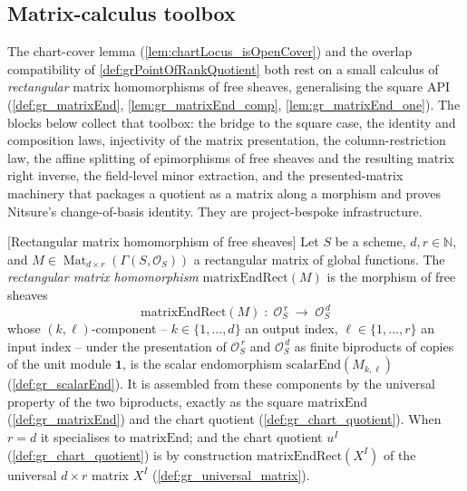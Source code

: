 \subsection{Matrix-calculus toolbox}

The chart-cover lemma (\cref{lem:chartLocus_isOpenCover}) and the overlap compatibility of
\cref{def:grPointOfRankQuotient} both rest on a small calculus of \emph{rectangular} matrix
homomorphisms of free sheaves, generalising the square API
(\cref{def:gr_matrixEnd}, \cref{lem:gr_matrixEnd_comp}, \cref{lem:gr_matrixEnd_one}). The
blocks below collect that toolbox: the bridge to the square case, the identity and
composition laws, injectivity of the matrix presentation, the column-restriction law, the
affine splitting of epimorphisms of free sheaves and the resulting matrix right inverse, the
field-level minor extraction, and the presented-matrix machinery that packages a quotient as
a matrix along a morphism and proves Nitsure's change-of-basis identity. They are
project-bespoke infrastructure.


\begin{definition}

[Rectangular matrix homomorphism of free sheaves]
  \label{def:gr_matrixEndRect}
  Let \(S\) be a scheme, \(d, r \in \mathbb{N}\), and
  \(M \in \operatorname{Mat}_{d \times r}(\Gamma(S, \mathcal{O}_S))\) a rectangular matrix
  of global functions. The \emph{rectangular matrix homomorphism}
  \(\mathrm{matrixEndRect}(M)\) is the morphism of free sheaves
  \[
    \mathrm{matrixEndRect}(M) \;:\; \mathcal{O}_S^{\,r}
      \;\longrightarrow\; \mathcal{O}_S^{\,d}
  \]
  whose \((k,\ell)\)-component -- \(k \in \{1,\dots,d\}\) an output index,
  \(\ell \in \{1,\dots,r\}\) an input index -- under the presentation of
  \(\mathcal{O}_S^{\,r}\) and \(\mathcal{O}_S^{\,d}\) as finite biproducts of copies of the
  unit module \(\mathbf 1\), is the scalar endomorphism \(\mathrm{scalarEnd}(M_{k,\ell})\)
  (\cref{def:gr_scalarEnd}). It is assembled from these components by the universal property
  of the two biproducts, exactly as the square \(\mathrm{matrixEnd}\)
  (\cref{def:gr_matrixEnd}) and the chart quotient (\cref{def:gr_chart_quotient}). When
  \(r = d\) it specialises to \(\mathrm{matrixEnd}\); and the chart quotient \(u^I\)
  (\cref{def:gr_chart_quotient}) is by construction \(\mathrm{matrixEndRect}(X^I)\) of the
  universal \(d \times r\) matrix \(X^I\) (\cref{def:gr_universal_matrix}).
\end{definition}

